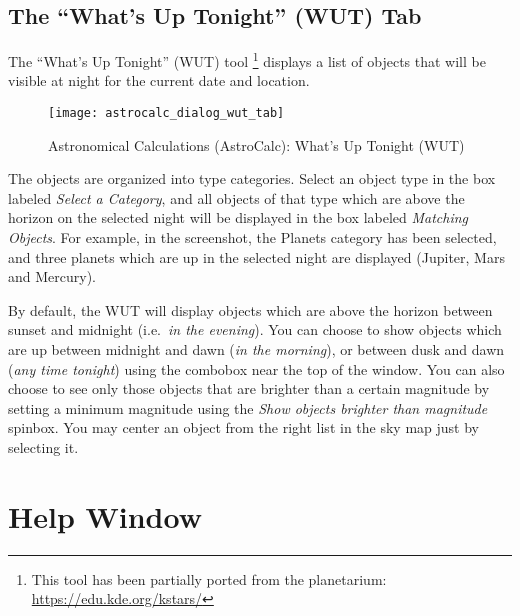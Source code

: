 \subsection{The ``What's Up Tonight'' (WUT) Tab}
\label{sec:gui:AstroCalc:WUT}

 The ``What's Up Tonight'' (WUT) tool%
	\footnote{This tool has been partially ported from the  planetarium: \url{https://edu.kde.org/kstars/}}
 displays a list of objects that will be visible at night for the current date and location.


\begin{figure}[htbp]
\centering\texttt{[image: astrocalc\_dialog\_wut\_tab]}
\caption{Astronomical Calculations (AstroCalc): What's Up Tonight (WUT)}
\label{fig:gui:AstroCalc:WUT}
\end{figure}

The objects are organized into type categories. Select an object type in the box labeled 
\emph{Select a Category}, and all objects of that type which are above the horizon on the selected night 
will be displayed in the box labeled \emph{Matching Objects}. For example, in the screenshot, 
the Planets category has been selected, and three planets which are up in the selected night are displayed (Jupiter, Mars and Mercury). 

By default, the WUT will display objects which are above the horizon between sunset and midnight (i.e.\ \emph{in the evening}). 
You can choose to show objects which are up between midnight and dawn (\emph{in the morning}), 
or between dusk and dawn (\emph{any time tonight}) using the combobox near the top of the window. 
You can also choose to see only those objects that are brighter than a certain magnitude by 
setting a minimum magnitude using the \emph{Show objects brighter than magnitude} spinbox. 
You may center an object from the right list in the sky map just by selecting it.


    
\section{Help Window}
\label{sec:gui:help}

